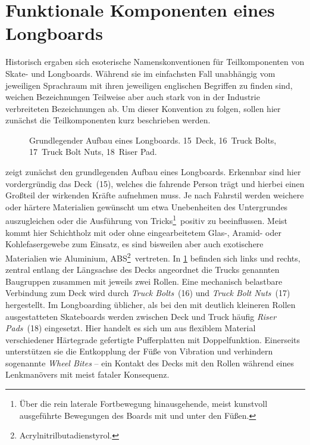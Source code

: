 	\section{Funktionale Komponenten eines Longboards}
		Historisch ergaben sich esoterische Namenskonventionen für Teilkomponenten von Skate- und Longboards.
		Während sie im einfachsten Fall unabhängig vom jeweiligen Sprachraum mit ihren jeweiligen englischen Begriffen zu finden sind, weichen Bezeichnungen Teilweise aber auch stark von in der Industrie verbreiteten Bezeichnungen ab.
		Um dieser Konvention zu folgen, sollen hier zunächst die Teilkomponenten kurz beschrieben werden.\par\medskip
		\begin{figure}[h]
			\centering
			
			\caption[Grundlegender Aufbau eines Longboards]{Grundlegender Aufbau eines Longboards. 15~Deck, 16~Truck Bolts, 17~Truck Bolt Nuts, 18~Riser Pad.}
			\label{fig:longboard}
		\end{figure}
		 zeigt zunächst den grundlegenden Aufbau eines Longboards.
		Erkennbar sind hier vordergründig das Deck~(15), welches die fahrende Person trägt und hierbei einen Großteil der wirkenden Kräfte aufnehmen muss.
		Je nach Fahrstil werden weichere oder härtere Materialien gewünscht um etwa Unebenheiten des Untergrundes auszugleichen oder die Ausführung von Tricks\footnote{Über die rein laterale Fortbewegung hinausgehende, meist kunstvoll ausgeführte Bewegungen des Boards mit und unter den Füßen.}~positiv zu beeinflussen.
		Meist kommt hier Schichtholz mit oder ohne eingearbeitetem Glas-, Aramid- oder Kohlefasergewebe zum Einsatz, es sind bisweilen aber auch exotischere Materialien wie Aluminium, ABS\footnote{Acrylnitrilbutadienstyrol.}~vertreten.
		In \cref{fig:longboard} befinden sich links und rechts, zentral entlang der Längsachse des Decks angeordnet die Trucks genannten Baugruppen zusammen mit jeweils zwei Rollen.
		Eine mechanisch belastbare Verbindung zum Deck wird durch \textit{Truck Bolts}~(16) und \textit{Truck Bolt Nuts}~(17) hergestellt.
		Im Longboarding üblicher, als bei den mit deutlich kleineren Rollen ausgestatteten Skateboards werden zwischen Deck und Truck häufig \textit{Riser Pads}~(18) eingesetzt.
		Hier handelt es sich um aus flexiblem Material verschiedener Härtegrade gefertigte Pufferplatten mit Doppelfunktion.
		Einerseits unterstützen sie die Entkopplung der Füße von Vibration und verhindern sogenannte \textit{Wheel Bites} -- ein Kontakt des Decks mit den Rollen während eines Lenkmanövers mit meist fataler Konsequenz.\par
